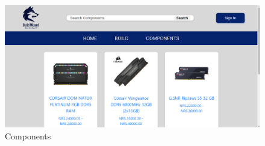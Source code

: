             \begin{figure}[H]
                \includegraphics[width=15cm]{Diagrams/rams.png}
                \caption{Components}
                \end{figure}
        

